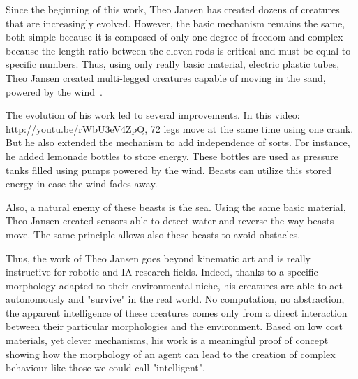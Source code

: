 Since the beginning of this work, Theo Jansen has created dozens of creatures that are increasingly evolved. However, the basic mechanism remains the same, both simple because it is composed of only one degree of freedom and complex because the length ratio between the eleven rods is critical and must be equal to specific numbers. Thus, using only really basic material, electric plastic tubes, Theo Jansen created multi-legged creatures capable of moving in the sand, powered by the wind~\parencite{jansen2007theo}.


The evolution of his work led to several improvements. In this video: \url{http://youtu.be/rWbU3eV4ZpQ}, 72 legs move at the same time using one crank. But he also extended the mechanism to add independence of sorts. For instance, he added lemonade bottles to store energy. These bottles are used as pressure tanks filled using pumps powered by the wind. Beasts can utilize this stored energy in case the wind fades away.

Also, a natural enemy of these beasts is the sea. Using the same basic material, Theo Jansen created sensors able to detect water and reverse the way beasts move. The same principle allows also these beasts to avoid obstacles.

Thus, the work of Theo Jansen goes beyond kinematic art and is really instructive for robotic and IA research fields. Indeed, thanks to a specific morphology adapted to their environmental niche, his creatures are able to act autonomously and "survive" in the real world. No computation, no abstraction, the apparent intelligence of these creatures comes only  from a direct interaction between their particular morphologies and the environment. Based on low cost materials, yet clever mechanisms, his work is a meaningful proof of concept showing how the morphology of an agent can lead to the creation of complex behaviour like those we could call "intelligent".





